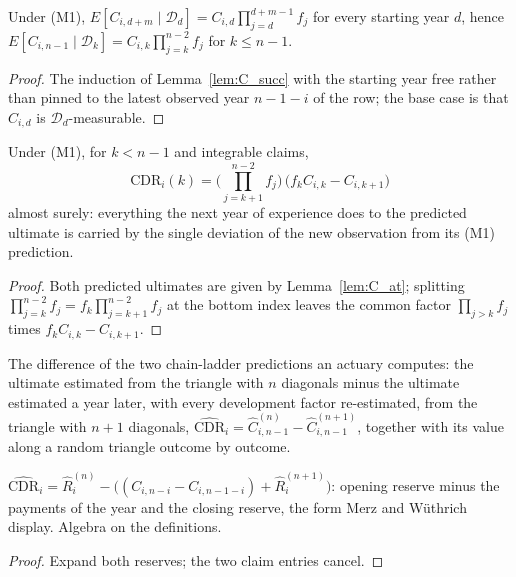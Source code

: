 \begin{lemma}\label{lem:C_at}\leanok
{}
Under (M1), $E[C_{i,d+m} \mid \mathcal{D}_d] = C_{i,d}\prod_{j=d}^{d+m-1} f_j$ for every starting
year $d$, hence $E[C_{i,n-1} \mid \mathcal{D}_k] = C_{i,k}\prod_{j=k}^{n-2} f_j$ for $k \le n-1$.
\end{lemma}
\begin{proof}\leanok
The induction of Lemma~\ref{lem:C_succ} with the starting year free rather than pinned to the
latest observed year $n-1-i$ of the row; the base case is that $C_{i,d}$ is
$\mathcal{D}_d$-measurable.
\end{proof}

\begin{theorem}\label{thm:cdr_closed}\leanok
{}
Under (M1), for $k < n-1$ and integrable claims,
\[
  \mathrm{CDR}_i(k) = \Big(\prod_{j=k+1}^{n-2} f_j\Big)\,\big(f_k C_{i,k} - C_{i,k+1}\big)
\]
almost surely: everything the next year of experience does to the predicted ultimate is carried
by the single deviation of the new observation from its (M1) prediction.
\end{theorem}
\begin{proof}\leanok
Both predicted ultimates are given by Lemma~\ref{lem:C_at}; splitting
$\prod_{j=k}^{n-2} f_j = f_k \prod_{j=k+1}^{n-2} f_j$ at the bottom index leaves the common
factor $\prod_{j>k} f_j$ times $f_k C_{i,k} - C_{i,k+1}$.
\end{proof}

\begin{definition}\label{def:obsCDR}\leanok
{}
The difference of the two chain-ladder predictions an actuary computes: the ultimate estimated
from the triangle with $n$ diagonals minus the ultimate estimated a year later, with every
development factor re-estimated, from the triangle with $n+1$ diagonals,
$\widehat{\mathrm{CDR}}_i = \hat C^{(n)}_{i,n-1} - \hat C^{(n+1)}_{i,n-1}$, together with its
value along a random triangle outcome by outcome.
\end{definition}

\begin{lemma}\label{lem:obsCDR_reserve}\leanok
{}
$\widehat{\mathrm{CDR}}_i = \hat R^{(n)}_i - \big((C_{i,n-i} - C_{i,n-1-i}) + \hat R^{(n+1)}_i\big)$:
opening reserve minus the payments of the year and the closing reserve, the form Merz and
Wüthrich display. Algebra on the definitions.
\end{lemma}
\begin{proof}\leanok Expand both reserves; the two claim entries cancel. \end{proof}

